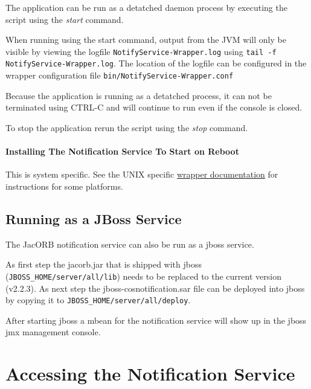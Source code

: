  The application can be run as a detatched daemon process by executing
 the script using the \emph{start} command.

 When running using the start  command, output from the JVM will only
 be visible by viewing the logfile \texttt{NotifyService-Wrapper.log}
 using \texttt{tail -f NotifyService-Wrapper.log}. The location of the
 logfile can be configured in the wrapper configuration file
 \texttt{bin/NotifyService-Wrapper.conf}

 Because the application is running as a detatched process, it can not
 be terminated using CTRL-C and will continue to run even if the
 console is closed.

 To stop the application rerun the script using the \emph{stop} command.

 \paragraph{Installing The Notification Service To Start on Reboot}
 \label{sec:inst-appl-start}

 This is system specific. See the UNIX specific
 \href{http://wrapper.tanukisoftware.org/doc/english/launch-nix.html}{wrapper
   documentation} for instructions for some platforms.

\subsection{Running as a JBoss Service}

The JacORB notification service can also be run as a jboss service.

As first step the jacorb.jar that is shipped with jboss (\texttt{JBOSS\_HOME/server/all/lib})
needs to be replaced to the current version (v2.2.3).
As next step the jboss-cosnotification.sar file can be deployed into jboss
by copying it to \texttt{JBOSS\_HOME/server/all/deploy}.

After starting jboss a mbean for the notification service will show up in
the jboss jmx management console.

\section{Accessing the Notification Service}
\label{sec:access-notif-serv}

